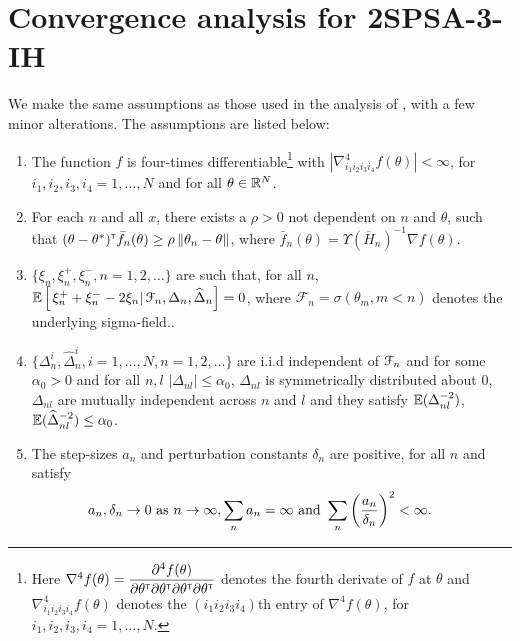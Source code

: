 \section{Convergence analysis for 2SPSA-3-IH}
\label{sec:2spsa-results}
We make the same assumptions as those used in the analysis of \cite{prashanth2015rdsa}, with a few minor alterations. The assumptions are listed below:
\begin{enumerate}[label=(\textbf{C\arabic*}),resume]
\item  The function
$f$ is four-times differentiable\footnote{Here $\nabla^4 f(\theta) = \dfrac{\partial^4 f (\theta)}{\partial \theta^\mathsf{\scriptscriptstyle T} \partial \theta^\mathsf{\scriptscriptstyle T} \partial \theta^\mathsf{\scriptscriptstyle T} \partial \theta^\mathsf{\scriptscriptstyle T}}$ denotes the fourth derivate of $f$ at $\theta$ and $\nabla^4_{i_1 i_2 i_3 i_4} f(\theta)$ denotes the $(i_1 i_2 i_3 i_4)$th entry of $\nabla^4 f(\theta)$, for $i_1, i_2, i_3,i_4=1,\ldots, N$.} with $\left|\nabla^4_{i_1 i_2 i_3 i_4} f(\theta) \right| < \infty$, for $i_1, i_2, i_3,i_4=1,\ldots, N$ and for all $\theta\in \mathbb{R}^N$. 


\item For each $n$ and all $x$, there exists a $\rho>0$ not dependent on $n$ and $\theta$, such that $(\theta-\theta^*)^\mathsf{\scriptscriptstyle T} \bar f_n(\theta) \ge \rho \left\| \theta_n - \theta\right\|$, where $\bar f_n(\theta) = \Upsilon(\overline H_n)^{-1} \nabla f(\theta)$.

\item $\{\xi_n, \xi_n^+,\xi_n^-, n=1,2,\ldots\}$ are such that, for all $n$, $\mathbb{E}\left[\left. \xi_n^+ + \xi_n^- - 2 \xi_n \right| \mathcal{F}_n, \Delta_n, \widehat \Delta_n \right] = 0$, where $\mathcal{F}_n = \sigma(\theta_m,m < n)$ denotes the underlying sigma-field.. 

\item $\{\Delta_n^i,\widehat\Delta_n^i, i=1,\ldots,N, n=1,2,\ldots\}$ are i.i.d independent of $\mathcal{F}_n$ and for some $\alpha_0 > 0$ and for all $n,l$ $|\Delta_{nl}|\le \alpha_0$, $\Delta_{nl}$ is symmetrically distributed about 0, $\Delta_{nl}$ are mutually independent across $n$ and $l$ and they satisfy $\mathbb{E} (\Delta_{nl}^{-2})$,$\mathbb{E} (\widehat\Delta_{nl}^{-2}) \le \alpha_0$.

\item  The step-sizes $a_n$ and perturbation constants $\delta_n$ are positive, for all $n$ and satisfy
$$\hspace{-1.7em} a_n, \delta_n \rightarrow 0\text{ as } n \rightarrow \infty, 
\sum_n a_n=\infty \text{ and } \sum_n \left(\frac{a_n}{\delta_n}\right)^2 <\infty.$$


\end{enumerate}

